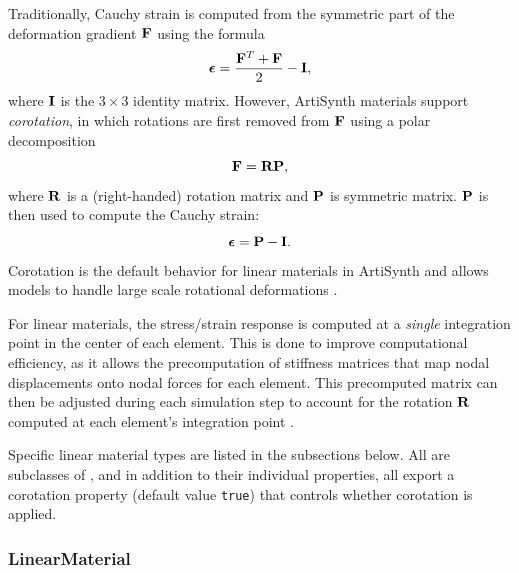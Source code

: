 Traditionally, Cauchy strain is computed from the symmetric part of
the deformation gradient $\F$ using the formula
%
\begin{equation}
\Beps = \frac{\F^T + \F}{2} - \I,
\end{equation}
%
where $\I$ is the $3 \times 3$ identity matrix. However, ArtiSynth
materials support {\it corotation}, in which rotations are first
removed from $\F$ using a polar decomposition
%
\begin{equation}
\F = \R \P,
\label{polardF:eqn}
\end{equation}
%
where $\R$ is a (right-handed) rotation matrix and $\P$ is symmetric
matrix. $\P$ is then used to compute the Cauchy strain:
%
\begin{equation}
\Beps = \P - \I.
\end{equation}
Corotation is the default behavior for linear materials in ArtiSynth
and allows models to handle large scale rotational deformations
\cite{ngan:fem:2008,muller2004interactive}.

For linear materials, the stress/strain response is computed at a {\it
single} integration point in the center of each element. This is done
to improve computational efficiency, as it allows the precomputation
of stiffness matrices that map nodal displacements onto nodal forces
for each element. This precomputed matrix can then be adjusted during
each simulation step to account for the rotation $\R$ computed at each
element's integration
point \cite{ngan:fem:2008,muller2004interactive}.

Specific linear material types are listed in the subsections
below. All are subclasses of
,
and in addition to their individual properties, all export a {\sf
corotation} property (default value {\tt true}) that controls whether
corotation is applied.

\subsubsection{LinearMaterial}


